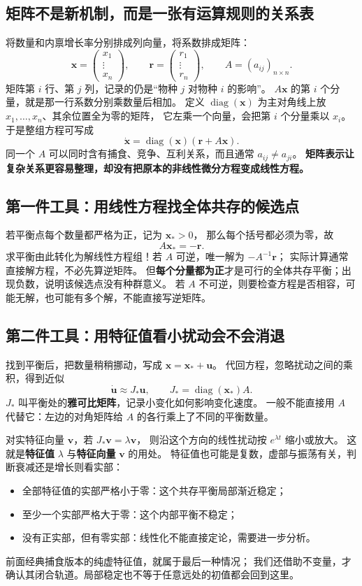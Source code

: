 \documentclass[UTF8,11pt,fontset=none]{ctexart}
\begin{document}
\subsection{矩阵不是新机制，而是一张有运算规则的关系表}
将数量和内禀增长率分别排成列向量，将系数排成矩阵：
\[
\mathbf x=\begin{pmatrix}x_1\\\vdots\\x_n\end{pmatrix},\qquad
\mathbf r=\begin{pmatrix}r_1\\\vdots\\r_n\end{pmatrix},\qquad
A=(a_{ij})_{n\times n}.
\]
矩阵第 $i$ 行、第 $j$ 列，记录的仍是“物种 $j$ 对物种 $i$ 的影响”。
$A\mathbf x$ 的第 $i$ 个分量，就是那一行系数分别乘数量后相加。
定义 $\operatorname{diag}(\mathbf x)$ 为主对角线上放 $x_1,\ldots,x_n$、其余位置全为零的矩阵，
它左乘一个向量，会把第 $i$ 个分量乘以 $x_i$。于是整组方程可写成
\[
\boxed{\dot{\mathbf x}=\operatorname{diag}(\mathbf x)(\mathbf r+A\mathbf x).}
\]
同一个 $A$ 可以同时含有捕食、竞争、互利关系，而且通常 $a_{ij}\ne a_{ji}$。
\textbf{矩阵表示让复杂关系更容易整理，却没有把原本的非线性微分方程变成线性方程。}

\subsection{第一件工具：用线性方程找全体共存的候选点}
若平衡点每个数量都严格为正，记为 $\mathbf x_*>0$，
那么每个括号都必须为零，故
\[
\boxed{A\mathbf x_*=-\mathbf r.}
\]
求平衡由此转化为解线性方程组！若 $A$ 可逆，唯一解为 $-A^{-1}\mathbf r$；
实际计算通常直接解方程，不必先算逆矩阵。
但\textbf{每个分量都为正}才是可行的全体共存平衡；出现负数，说明该候选点没有种群意义。
若 $A$ 不可逆，则要检查方程是否相容，可能无解，也可能有多个解，不能直接写逆矩阵。

\subsection{第二件工具：用特征值看小扰动会不会消退}
找到平衡后，把数量稍稍挪动，写成 $\mathbf x=\mathbf x_*+\mathbf u$。
代回方程，忽略扰动之间的乘积，得到近似
\[
\dot{\mathbf u}\approx J_*\mathbf u,\qquad
\boxed{J_*=\operatorname{diag}(\mathbf x_*)A.}
\]
$J_*$ 叫平衡处的\textbf{雅可比矩阵}，记录小变化如何影响变化速度。
一般不能直接用 $A$ 代替它：左边的对角矩阵给 $A$ 的各行乘上了不同的平衡数量。

对实特征向量 $\mathbf v$，若 $J_*\mathbf v=\lambda\mathbf v$，
则沿这个方向的线性扰动按 $e^{\lambda t}$ 缩小或放大。
这就是\textbf{特征值} $\lambda$ 与\textbf{特征向量} $\mathbf v$ 的用处。
特征值也可能是复数，虚部与振荡有关，判断衰减还是增长则看实部：
\begin{itemize}
\item 全部特征值的实部严格小于零：这个共存平衡局部渐近稳定；
\item 至少一个实部严格大于零：这个内部平衡不稳定；
\item 没有正实部，但有零实部：线性化不能直接定论，需要进一步分析。
\end{itemize}
前面经典捕食版本的纯虚特征值，就属于最后一种情况；
我们还借助不变量，才确认其闭合轨道。局部稳定也不等于任意远处的初值都会回到这里。
\end{document}
